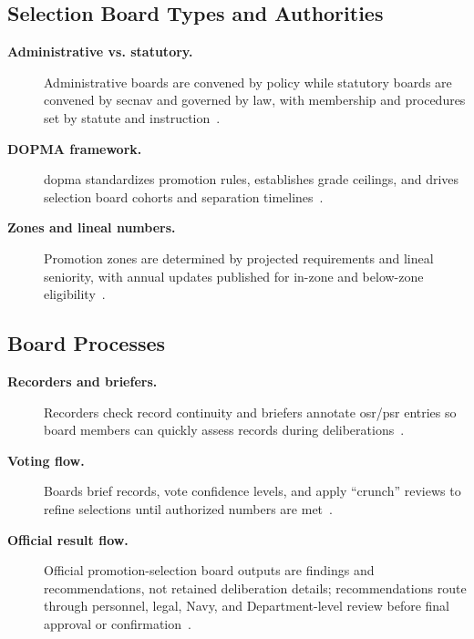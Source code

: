 \documentclass[../main.tex]{subfiles}
\begin{document}
\subsection{Selection Board Types and Authorities}
\begin{description}
  \item[\textbf{Administrative vs. statutory.}] Administrative boards are convened by policy while statutory
  boards are convened by \ac{secnav} and governed by law, with membership and procedures set by
  statute and instruction~\autocite{edo-5-2-3-career-topics-2025,MyNavyHR-Selection-Boards-2026}.
  \item[\textbf{DOPMA framework.}] \ac{dopma} standardizes promotion rules, establishes grade ceilings,
  and drives selection board cohorts and separation timelines~\autocite{edo-5-2-3-career-topics-2025}.
  \item[\textbf{Zones and lineal numbers.}] Promotion zones are determined by projected requirements and
  lineal seniority, with annual updates published for in-zone and below-zone eligibility~\autocite{edo-5-2-3-career-topics-2025}.
\end{description}

\subsection{Board Processes}
\begin{description}
  \item[\textbf{Recorders and briefers.}] Recorders check record continuity and briefers annotate \ac{osr}/\ac{psr}
  entries so board members can quickly assess records during deliberations~\autocite{edo-5-2-3-career-topics-2025}.
  \item[\textbf{Voting flow.}] Boards brief records, vote confidence levels, and apply ``crunch'' reviews to
  refine selections until authorized numbers are met~\autocite{edo-5-2-3-career-topics-2025}.
  \item[\textbf{Official result flow.}] Official promotion-selection board outputs are findings and recommendations,
  not retained deliberation details; recommendations route through personnel, legal, Navy, and Department-level review
  before final approval or confirmation~\autocite{MyNavyHR-Selection-Boards-2026}.
\end{description}
\end{document}
